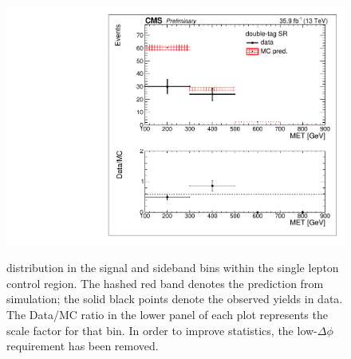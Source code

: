 \begin{figure}[hbp!]
\includegraphics[trim={5px 5px 5px 5px},clip,width=0.45\linewidth]{figs/SUS17006/ABCDscaleFactors_MET_double-tagSR_lowDeltaPhi_singleLep.pdf}\\
\caption{
 \ptmiss distribution in the signal and sideband bins within the single lepton control region. The hashed red band denotes the prediction from simulation; the solid black points denote the observed yields in data. The Data/MC ratio in the lower panel of each plot represents the scale factor for that bin. In order to improve statistics, the low-$\Delta\phi$ requirement has been removed.
}
\label{fig:closuresinglelep}
\end{figure}

